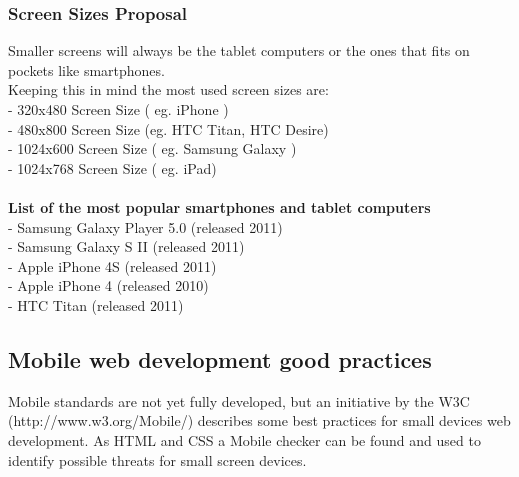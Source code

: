 \subsubsection{Screen Sizes Proposal}
Smaller screens will always be the tablet computers or the ones that fits on pockets like smartphones.\\
Keeping this in mind the most used screen sizes are:\\
- 320x480 Screen Size ( eg. iPhone )\\ 	%
- 480x800 Screen Size (eg. HTC Titan, HTC Desire)\\ %
- 1024x600 Screen Size ( eg. Samsung Galaxy )\\
- 1024x768 Screen Size ( eg. iPad)\\
\\
\noindent \textbf{List of the most popular smartphones and tablet computers}\\
- Samsung Galaxy Player 5.0 (released 2011)\\
- Samsung Galaxy S II (released 2011)\\
- Apple iPhone 4S (released 2011)\\
- Apple iPhone 4 (released 2010)\\
- HTC Titan (released 2011)\\

\subsection{Mobile web development good practices}

Mobile standards are not yet fully developed, but an initiative by the W3C (http://www.w3.org/Mobile/) describes some best practices for small devices web development. As HTML and CSS a Mobile checker can be found and used to identify possible threats for small screen devices.

